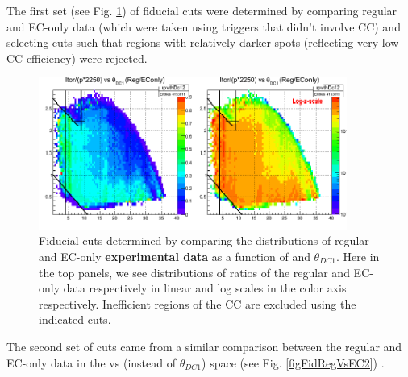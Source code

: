 The first set (see Fig. \ref{figFidRegVsEC1}) of fiducial cuts  were determined by comparing regular and EC-only data (which were taken using triggers that didn't involve CC) and selecting cuts such that regions with relatively darker spots (reflecting very low CC-efficiency) were rejected.

\begin{figure}[H]%
\centering
\leavevmode \includegraphics[width=0.9\textwidth]{figuresEG4/NewP2/FidCuts/invMomVsThDc1Pass2Ebi4RatioCropped.png}
\caption[Fiducial cuts]{Fiducial cuts determined by comparing the distributions of regular and EC-only {\bf experimental data} as a function of \invP and $\theta_{DC1}$. %
Here in the top panels, we see distributions of ratios of the regular and EC-only data respectively in linear and log scales in the color axis respectively. Inefficient regions of the CC are excluded using the indicated cuts.} %
\label{figFidRegVsEC1}
\end{figure}

The second set of cuts came from a similar comparison between the regular and EC-only data in the \invP vs \thvtx (instead of $\theta_{DC1}$) space (see Fig. \ref{figFidRegVsEC2}) .


